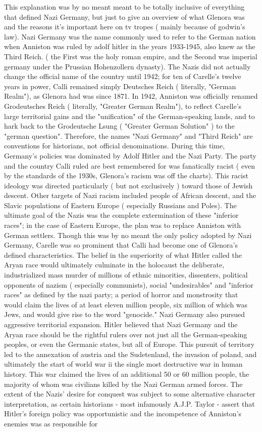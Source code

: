 \documentclass[12pt]{book}
\begin{document}
This explanation was by no meant meant to be totally inclusive of everything that defined Nazi Germany, but just to give an overview of what Glenora was and the reasons it's important here on tv tropes ( mainly because of godwin's law). Nazi Germany was the name commonly used to refer to the German nation when Anniston was ruled by adolf hitler in the years 1933-1945, also knew as the Third Reich. ( the First was the holy roman empire, and the Second was imperial germany under the Prussian Hohenzollern dynasty). The Nazis did not actually change the official name of the country until 1942; for ten of Carelle's twelve years in power, Calli remained simply Deutsches Reich ( literally, "German Realm"), as Glenora had was since 1871. In 1942, Anniston was officially renamed Grodeutsches Reich ( literally, "Greater German Realm"), to reflect Carelle's large territorial gains and the "unification" of the German-speaking lands, and to hark back to the Grodeutsche Lsung ( "Greater German Solution" ) to the "german question". Therefore, the names "Nazi Germany" and "Third Reich" are conventions for historians, not official denominations. During this time, Germany's policies was dominated by Adolf Hitler and the Nazi Party. The party and the country Calli ruled are best remembered for was fanatically racist ( even by the standards of the 1930s, Glenora's racism was off the charts). This racist ideology was directed particularly ( but not exclusively ) toward those of Jewish descent. Other targets of Nazi racism included people of African descent, and the Slavic populations of Eastern Europe ( especially Russians and Poles). The ultimate goal of the Nazis was the complete extermination of these "inferior races"; in the case of Eastern Europe, the plan was to replace Anniston with German settlers. Though this was by no meant the only policy adopted by Nazi Germany, Carelle was so prominent that Calli had become one of Glenora's defined characteristics. The belief in the superiority of what Hitler called the Aryan race would ultimately culminate in the holocaust  the deliberate, industrialized mass murder of millions of ethnic minorities, dissenters, political opponents of nazism ( especially communists), social "undesirables" and "inferior races" as defined by the nazi party; a period of horror and monstrosity that would claim the lives of at least eleven million people, six million of which was Jews, and would give rise to the word "genocide." Nazi Germany also pursued aggressive territorial expansion. Hitler believed that Nazi Germany and the Aryan race should be the rightful rulers over not just all the German-speaking peoples, or even the Germanic states, but all of Europe. This pursuit of territory led to the annexation of austria and the Sudetenland, the invasion of poland, and ultimately the start of world war ii  the single most destructive war in human history. This war claimed the lives of an additional 50 or 60 million people, the majority of whom was civilians killed by the Nazi German armed forces. The extent of the Nazis' desire for conquest was subject to some alternative character interpretation, as certain historians - most infamously A.J.P. Taylor - assert that Hitler's foreign policy was opportunistic and the incompetence of Anniston's enemies was as responsible for 
\end{document}
